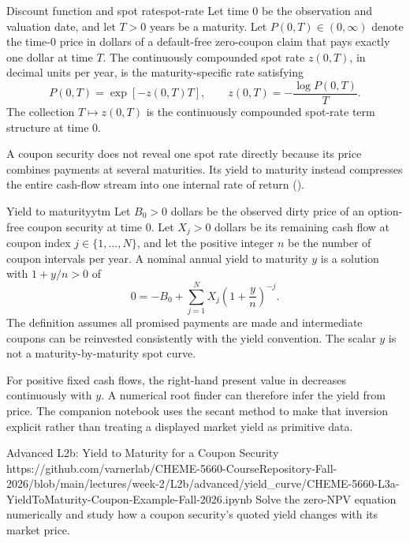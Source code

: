 \documentclass[11pt]{article}
\begin{document}
\begin{definition}{Discount function and spot rate}{spot-rate}
Let time $0$ be the observation and valuation date, and let $T>0$ years be a maturity. Let $P(0,T)\in(0,\infty)$ denote the time-0 price in dollars of a default-free zero-coupon claim that pays exactly one dollar at time $T$. The continuously compounded spot rate $z(0,T)$, in decimal units per year, is the maturity-specific rate satisfying
\begin{equation}
  \label{eq:spot-rate}
  P(0,T)=\exp[-z(0,T)T],
  \qquad
  z(0,T)=-\frac{\log P(0,T)}{T}.
\end{equation}
The collection $T\mapsto z(0,T)$ is the continuously compounded spot-rate term structure at time 0.
\end{definition}

A coupon security does not reveal one spot rate directly because its price combines payments at several maturities. Its yield to maturity instead compresses the entire cash-flow stream into one internal rate of return ().

\begin{definition}{Yield to maturity}{ytm}
Let $B_0>0$ dollars be the observed dirty price of an option-free coupon security at time 0. Let $X_j>0$ dollars be its remaining cash flow at coupon index $j\in\{1,\ldots,N\}$, and let the positive integer $n$ be the number of coupon intervals per year. A nominal annual yield to maturity $y$ is a solution with $1+y/n>0$ of
\begin{equation}
  \label{eq:ytm}
  0=-B_0+\sum_{j=1}^{N}X_j\left(1+\frac{y}{n}\right)^{-j}.
\end{equation}
The definition assumes all promised payments are made and intermediate coupons can be reinvested consistently with the yield convention. The scalar $y$ is not a maturity-by-maturity spot curve.
\end{definition}

For positive fixed cash flows, the right-hand present value in  decreases continuously with $y$. A numerical root finder can therefore infer the yield from price. The companion notebook uses the secant method to make that inversion explicit rather than treating a displayed market yield as primitive data.

\notebooklink
  {Advanced L2b: Yield to Maturity for a Coupon Security}
  {https://github.com/varnerlab/CHEME-5660-CourseRepository-Fall-2026/blob/main/lectures/week-2/L2b/advanced/yield_curve/CHEME-5660-L3a-YieldToMaturity-Coupon-Example-Fall-2026.ipynb}
  {Solve the zero-NPV equation numerically and study how a coupon security's quoted yield changes with its market price.}
\end{document}
